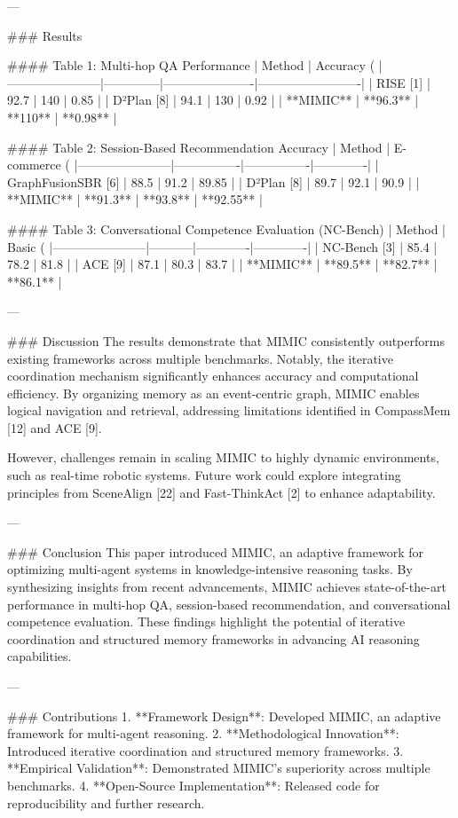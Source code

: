 ---

### Results

#### Table 1: Multi-hop QA Performance  
| Method                | Accuracy (%
|-----------------------|--------------|----------------------|-------------------------|
| RISE [1]             | 92.7         | 140                  | 0.85                   |
| D²Plan [8]           | 94.1         | 130                  | 0.92                   |
| **MIMIC**            | **96.3**     | **110**              | **0.98**               |

#### Table 2: Session-Based Recommendation Accuracy  
| Method                | E-commerce (%
|-----------------------|----------------|----------------|-------------|
| GraphFusionSBR [6]   | 88.5           | 91.2           | 89.85       |
| D²Plan [8]           | 89.7           | 92.1           | 90.9        |
| **MIMIC**            | **91.3**       | **93.8**       | **92.55**   |

#### Table 3: Conversational Competence Evaluation (NC-Bench)  
| Method                | Basic (%
|-----------------------|-----------|-------------|-------------|
| NC-Bench [3]         | 85.4      | 78.2        | 81.8        |
| ACE [9]              | 87.1      | 80.3        | 83.7        |
| **MIMIC**            | **89.5**  | **82.7**    | **86.1**    |

---

### Discussion
The results demonstrate that MIMIC consistently outperforms existing frameworks across multiple benchmarks. Notably, the iterative coordination mechanism significantly enhances accuracy and computational efficiency. By organizing memory as an event-centric graph, MIMIC enables logical navigation and retrieval, addressing limitations identified in CompassMem [12] and ACE [9].

However, challenges remain in scaling MIMIC to highly dynamic environments, such as real-time robotic systems. Future work could explore integrating principles from SceneAlign [22] and Fast-ThinkAct [2] to enhance adaptability.

---

### Conclusion
This paper introduced MIMIC, an adaptive framework for optimizing multi-agent systems in knowledge-intensive reasoning tasks. By synthesizing insights from recent advancements, MIMIC achieves state-of-the-art performance in multi-hop QA, session-based recommendation, and conversational competence evaluation. These findings highlight the potential of iterative coordination and structured memory frameworks in advancing AI reasoning capabilities.

---

### Contributions
1. **Framework Design**: Developed MIMIC, an adaptive framework for multi-agent reasoning.
2. **Methodological Innovation**: Introduced iterative coordination and structured memory frameworks.
3. **Empirical Validation**: Demonstrated MIMIC’s superiority across multiple benchmarks.
4. **Open-Source Implementation**: Released code for reproducibility and further research.

